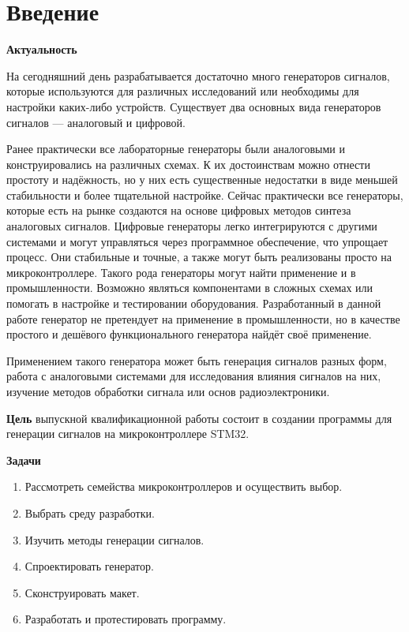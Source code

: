 \chapter*{Введение}

\textbf{Актуальность}

	На сегодняшний день разрабатывается достаточно много генераторов сигналов, которые используются для различных исследований или необходимы для настройки каких-либо устройств. Существует два основных вида генераторов сигналов --- аналоговый и цифровой.
	
	Ранее практически все лабораторные генераторы были аналоговыми и конструировались на различных схемах. К их достоинствам можно отнести простоту и надёжность, но у них есть существенные недостатки в виде меньшей стабильности и более тщательной настройке. Сейчас практически все генераторы, которые есть на рынке создаются на основе цифровых методов синтеза аналоговых сигналов. Цифровые генераторы легко интегрируются с другими системами и могут управляться через программное обеспечение, что упрощает процесс. Они стабильные и точные, а также могут быть реализованы просто на микроконтроллере. Такого рода генераторы могут найти применение и в промышленности. Возможно являться компонентами в сложных схемах или помогать в настройке и тестировании оборудования. Разработанный в данной работе генератор не претендует на применение в промышленности, но в качестве простого и дешёвого функционального генератора найдёт своё применение.
	
	Применением такого генератора может быть генерация сигналов разных форм, работа с аналоговыми системами для исследования влияния сигналов на них, изучение методов обработки сигнала или основ радиоэлектроники. 
	
\textbf{Цель}
выпускной квалификационной работы состоит в создании программы для генерации сигналов на микроконтроллере STM32.

\textbf{Задачи}

\begin{enumerate}
\item Рассмотреть семейства микроконтроллеров и осуществить выбор.
\item Выбрать среду разработки.
\item Изучить методы генерации сигналов.
\item Спроектировать генератор.
\item Сконструировать макет.
\item Разработать и протестировать программу.
\end{enumerate}

